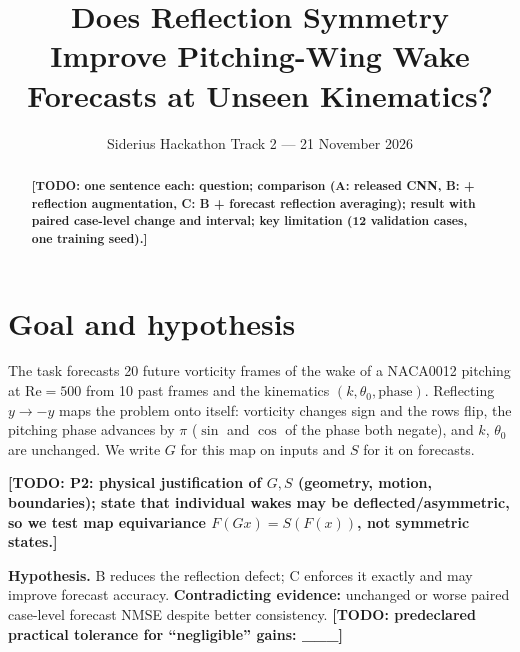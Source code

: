 \documentclass[11pt]{article}
\title{Does Reflection Symmetry Improve Pitching-Wing Wake Forecasts at Unseen Kinematics?}
\author{\todo{team name / members}}
\date{Siderius Hackathon Track 2 --- 21 November 2026}
\newcommand{\todo}[1]{\textbf{[TODO: #1]}}
\begin{document}
\maketitle

\begin{abstract}
\todo{one sentence each: question; comparison (A: released CNN, B: + reflection augmentation,
C: B + forecast reflection averaging); result with paired case-level change and interval;
key limitation (12 validation cases, one training seed).}
\end{abstract}

\section{Goal and hypothesis}
The task forecasts 20 future vorticity frames of the wake of a NACA0012 pitching at
$\mathrm{Re}=500$ from 10 past frames and the kinematics $(k, \theta_0, \text{phase})$.
Reflecting $y\to-y$ maps the problem onto itself: vorticity changes sign and the rows flip,
the pitching phase advances by $\pi$ ($\sin$ and $\cos$ of the phase both negate), and
$k$, $\theta_0$ are unchanged. We write $G$ for this map on inputs and $S$ for it on forecasts.

\todo{P2: physical justification of $G,S$ (geometry, motion, boundaries); state that individual
wakes may be deflected/asymmetric, so we test map equivariance $F(Gx)=S(F(x))$, not symmetric states.}

\noindent\textbf{Hypothesis.} B reduces the reflection defect; C enforces it exactly and may improve
forecast accuracy. \textbf{Contradicting evidence:} unchanged or worse paired case-level forecast
NMSE despite better consistency. \todo{predeclared practical tolerance for ``negligible'' gains: \_\_\_}

\end{document}
